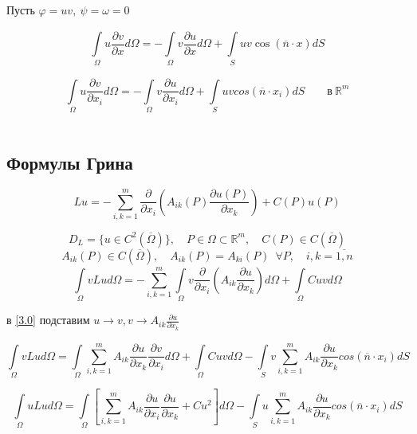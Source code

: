 \documentclass[12pt, a4paper]{article}
\begin{document}
Пусть $ \varphi = uv, \ \psi = \omega = 0 $

\[ \int\limits_{\Omega} u \frac{\partial v }{\partial x } d \Omega = - \int\limits_{\Omega}^{} v \frac{\partial u }{\partial x } d \Omega + \int\limits_{S}^{} uv \cos(\overline{n} \cdot x) dS \]

\begin{equation}
	\label{3.0}
	\tag{3.0}
	\int\limits_{\Omega } u \frac{\partial v }{\partial x_i} d \Omega = - \int\limits_{\Omega }^{} v \frac{\partial u}{\partial x_i} d \Omega + \int\limits_{S }^{} uv cos(\overline{n} \cdot x_i ) dS \qquad \text{в} \ \mathbb{R}^m
\end{equation} \\

\subsection{Формулы Грина}

\[ Lu = - \sum_{i,k =1}^{m } \frac{\partial }{\partial x_i} \left(A_{ik} (P) \frac{ \partial u(P)}{\partial x_k}\right) + C(P) u(P) \]

\[ D_L = \{ u \in C^2(\overline{\Omega}) \}, \quad P \in \Omega \subset \mathbb{R}^m, \quad C(P) \in C(\overline{\Omega}) \]
\[ A_{ik}(P) \in C(\overline{\Omega}), \quad A_{ik}(P) = A_{ki}(P) \enspace \forall P, \quad i,k=\overline{1,n} \]
\[ \int\limits_{\Omega} v Lu d \Omega = - \sum_{i,k =1}^{m }  \int\limits_{\Omega} v \frac{\partial }{\partial x_i} \left(A_{ik} \frac{ \partial u}{\partial x_k}\right) d \Omega + \int\limits_{\Omega}^{}C u v d \Omega  \]

в \eqref{3.0} подставим $ u \rightarrow v, v \rightarrow A_{ik} \frac{\partial u }{\partial x_k }$

\begin{equation}
	\label{3.1}
	\tag{3.1}
	\int\limits_{\Omega}^{} v L u d\Omega = \int\limits_{\Omega}^{} \sum_{i,k = 1}^{m}A_{ik} \frac{\partial u }{\partial x_k} \frac{\partial v }{\partial x_i} d\Omega + \int\limits_{\Omega} C u vd\Omega - \int\limits_{S }^{} v \sum_{i,k=1}^{m} A_{ik} \frac{\partial u}{\partial x_k } cos(\overline{n} \cdot x_i ) dS
\end{equation}

\begin{equation}
	\label{3.2}
	\tag{3.2}
	\int\limits_{\Omega}^{} u L u d\Omega = \int\limits_{\Omega} \left[ \sum_{i,k = 1}^{m}A_{ik} \frac{\partial u }{\partial x_i} \frac{\partial u }{\partial x_k} + Cu^2 \right] d\Omega - \int\limits_{S } u \sum_{i,k =1}^{m} A_{ik} \frac{\partial u}{\partial x_k } cos(\overline{n} \cdot x_i ) dS
\end{equation}
\end{document}
